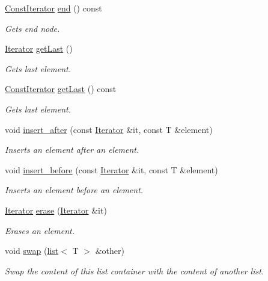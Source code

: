 \begin{DoxyCompactItemize}
\hyperlink{classirr_1_1core_1_1list_1_1ConstIterator}{Const\+Iterator} \hyperlink{classirr_1_1core_1_1list_a6209ac37decfb5f29da921ea40b46e10}{end} () const
\begin{DoxyCompactList}\small\item\em Gets end node. \end{DoxyCompactList}\item 
\hyperlink{classirr_1_1core_1_1list_1_1Iterator}{Iterator} \hyperlink{classirr_1_1core_1_1list_a6ba09d4c7865a451e40b5bd5f4c2dd50}{get\+Last} ()
\begin{DoxyCompactList}\small\item\em Gets last element. \end{DoxyCompactList}\item 
\hyperlink{classirr_1_1core_1_1list_1_1ConstIterator}{Const\+Iterator} \hyperlink{classirr_1_1core_1_1list_a7b296ee9e099847dadf9a0a18df842e9}{get\+Last} () const
\begin{DoxyCompactList}\small\item\em Gets last element. \end{DoxyCompactList}\item 
void \hyperlink{classirr_1_1core_1_1list_aa4b91d7a9191fc98266425366b774c8a}{insert\+\_\+after} (const \hyperlink{classirr_1_1core_1_1list_1_1Iterator}{Iterator} \&it, const T \&element)
\begin{DoxyCompactList}\small\item\em Inserts an element after an element. \end{DoxyCompactList}\item 
void \hyperlink{classirr_1_1core_1_1list_a366070e0356029f0b355f5dd81710b29}{insert\+\_\+before} (const \hyperlink{classirr_1_1core_1_1list_1_1Iterator}{Iterator} \&it, const T \&element)
\begin{DoxyCompactList}\small\item\em Inserts an element before an element. \end{DoxyCompactList}\item 
\hyperlink{classirr_1_1core_1_1list_1_1Iterator}{Iterator} \hyperlink{classirr_1_1core_1_1list_a407935fc79a35ce7caa19e4f6ce25c3f}{erase} (\hyperlink{classirr_1_1core_1_1list_1_1Iterator}{Iterator} \&it)
\begin{DoxyCompactList}\small\item\em Erases an element. \end{DoxyCompactList}\item 
void \hyperlink{classirr_1_1core_1_1list_a860e4dab70f2ac5f13b9385f7f63d5b9}{swap} (\hyperlink{classirr_1_1core_1_1list}{list}$<$ T $>$ \&other)
\begin{DoxyCompactList}\small\item\em Swap the content of this list container with the content of another list. \end{DoxyCompactList}\end{DoxyCompactItemize}


